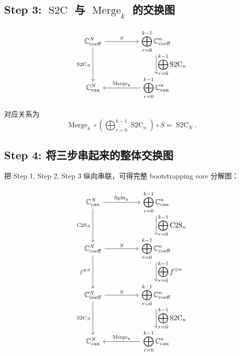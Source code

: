 \documentclass[UTF8,11pt]{ctexart}
\theoremstyle{definition}
\newcommand{\CtwoS}{\operatorname{C2S}}
\newcommand{\StwoC}{\operatorname{S2C}}
\newcommand{\Split}{\operatorname{Split}}
\newcommand{\Merge}{\operatorname{Merge}}
\begin{document}
\subsection*{Step 3: \(\StwoC\) 与 \(\Merge_k\) 的交换图}

\[
\begin{tikzcd}[column sep=huge,row sep=large]
\mathbb{C}^{N}_{\mathrm{coeff}}
    \arrow[r,"S"]
    \arrow[d,"\StwoC_N"']
&
\displaystyle\bigoplus_{r=0}^{k-1}\mathbb{C}^{n}_{\mathrm{coeff}}
    \arrow[d,"\displaystyle\bigoplus_{r=0}^{k-1}\StwoC_n"]
\\
\mathbb{C}^{N}_{\mathrm{can}}
&
\displaystyle\bigoplus_{r=0}^{k-1}\mathbb{C}^{n}_{\mathrm{can}}
    \arrow[l,"\Merge_k"']
\end{tikzcd}
\]

对应关系为
\[
\boxed{
\Merge_k\circ
\left(\bigoplus_{r=0}^{k-1}\StwoC_n\right)\circ S
=
\StwoC_N.
}
\]

\subsection*{Step 4: 将三步串起来的整体交换图}

把 Step 1, Step 2, Step 3 纵向串联，可得完整 bootstrapping core 分解图：

\[
\begin{tikzcd}[column sep=huge,row sep=large]
\mathbb{C}^{N}_{\mathrm{can}}
    \arrow[r,"\Split_k"]
    \arrow[d,"\CtwoS_N"']
&
\displaystyle\bigoplus_{r=0}^{k-1}\mathbb{C}^{n}_{\mathrm{can}}
    \arrow[d,"\displaystyle\bigoplus_{r=0}^{k-1}\CtwoS_n"]
\\
\mathbb{C}^{N}_{\mathrm{coeff}}
    \arrow[r,"S"]
    \arrow[d,"f^{\oplus N}"']
&
\displaystyle\bigoplus_{r=0}^{k-1}\mathbb{C}^{n}_{\mathrm{coeff}}
    \arrow[d,"\displaystyle\bigoplus_{r=0}^{k-1}f^{\oplus n}"]
\\
\mathbb{C}^{N}_{\mathrm{coeff}}
    \arrow[r,"S"]
    \arrow[d,"\StwoC_N"']
&
\displaystyle\bigoplus_{r=0}^{k-1}\mathbb{C}^{n}_{\mathrm{coeff}}
    \arrow[d,"\displaystyle\bigoplus_{r=0}^{k-1}\StwoC_n"]
\\
\mathbb{C}^{N}_{\mathrm{can}}
&
\displaystyle\bigoplus_{r=0}^{k-1}\mathbb{C}^{n}_{\mathrm{can}}
    \arrow[l,"\Merge_k"']
\end{tikzcd}
\]
\end{document}
